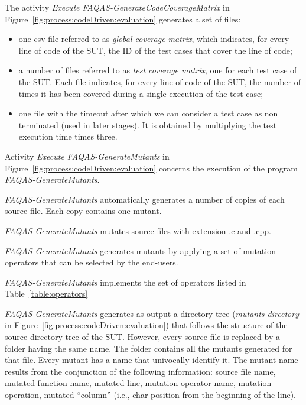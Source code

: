 \RQ{} The activity \emph{Execute FAQAS-GenerateCodeCoverageMatrix} in Figure~\ref{fig:process:codeDriven:evaluation} generates a set of files: 
\begin{itemize}
\item one csv file referred to as \emph{global coverage matrix}, which indicates, for every line of code of the SUT, the ID of the test cases that cover the line of code;
\item a number of files  referred to as \emph{test coverage matrix}, one for each test case of the SUT. Each file indicates, for every line of code of the SUT, the number of times it has been covered during a single execution of the test case;
\item one file with the timeout after which we can consider a test case as non terminated (used in later stages). It is obtained by multiplying the test execution time times three.
\end{itemize}



\RQ{} Activity \emph{Execute FAQAS-GenerateMutants} in Figure~\ref{fig:process:codeDriven:evaluation} concerns the execution of the program \emph{FAQAS-GenerateMutants}. 

\RQ{} \emph{FAQAS-GenerateMutants} automatically generates a number of copies of each source file. Each copy contains one mutant.

\RQ{} \emph{FAQAS-GenerateMutants} mutates source files with extension .c and .cpp.

\RQ{} \emph{FAQAS-GenerateMutants} generates mutants by applying a set of mutation operators that can be selected by the end-users.

\RQ{} \emph{FAQAS-GenerateMutants} implements the set of operators listed in Table~\ref{table:operators}




\RQ{} \emph{FAQAS-GenerateMutants} generates as output a directory tree (\emph{mutants directory} in Figure~\ref{fig:process:codeDriven:evaluation}) that follows the structure of the source directory tree of the SUT. However, every source file is replaced by a folder having the same name. The folder contains all the mutants generated for that file. Every mutant has a name that univocally identify it. The mutant name results from the conjunction of the following information:
source file name, mutated function name, mutated line, mutation operator name, mutation operation, mutated “column” (i.e., char position from the beginning of the line).








